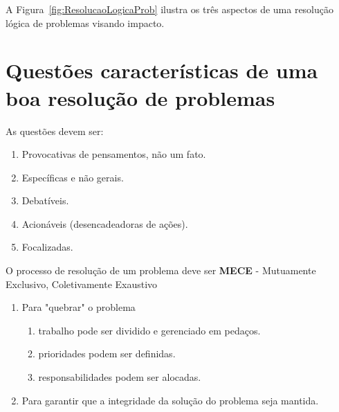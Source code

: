 A Figura~\ref{fig:ResolucaoLogicaProb} ilustra os três aspectos de uma resolução lógica de problemas visando impacto.


\section{Questões características de uma boa resolução de problemas}

As questões devem ser:

\begin{enumerate}
	\item  Provocativas de pensamentos, não um fato.
	\item  Específicas e não gerais.
	\item  Debatíveis.
	\item  Acionáveis (desencadeadoras de ações).
	\item  Focalizadas.
\end{enumerate}

O processo de resolução de um problema deve ser \textbf{MECE} - Mutuamente
Exclusivo, Coletivamente Exaustivo

\begin{enumerate}
	\item  Para "quebrar" o problema
	\begin{enumerate}
		\item   trabalho pode ser dividido e gerenciado em pedaços.
		\item    prioridades podem ser definidas.
		\item    responsabilidades podem ser alocadas.
	\end{enumerate}
	
	\item   Para garantir que a integridade da solução do problema seja mantida.
	
\end{enumerate}

